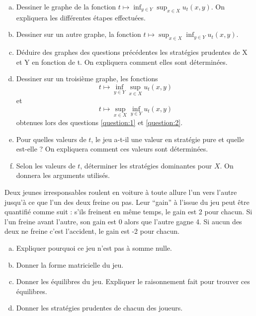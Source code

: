 \documentclass[french,11pt,leqno]{article}
\newcounter{exocount}
\newcounter{questcount}
\def\exo{\bigskip\noindent{\bf Exercice \theexocount {} -}
  \addtocounter{exocount}{1} \setcounter{questcount}{1}}
\begin{document}
\begin{enumerate}[a)]%
\item Dessiner le graphe de la fonction $t \mapsto \inf_{y \in Y} \sup_{x \in X} u_t(x,y)$. On expliquera les diff\'erentes \'etapes effectu\'ees. \label{question:1}
\item Dessiner sur un autre graphe, la fonction $t \mapsto \sup_{x \in X} \inf_{y \in Y} u_t(x,y)$. \label{question:2}
\item D\'eduire des graphes des questions pr\'ec\'edentes les strat\'egies prudentes de X et Y en fonction de t. 
     On expliquera comment elles sont d\'etermin\'ees.
\item Dessiner sur un troisi\`eme graphe, les fonctions \[t \mapsto \inf_{y \in Y} \sup_{x \in X} u_t(x,y)\] et \[t \mapsto \sup_{x \in X} \inf_{y \in Y} u_t(x,y)\]
 obtenues lors des questions \ref{question:1} et \ref{question:2}. 
\item Pour quelles valeurs de $t$, le jeu a-t-il une valeur en strat\'egie pure et quelle est-elle ? On expliquera comment ces valeurs sont d\'etermin\'ees.
\item Selon les valeurs de $t$, d\'eterminer les strat\'egies dominantes pour $X$. On donnera les arguments utilis\'es.


\end{enumerate}





\exo
Deux jeunes irresponsables roulent en voiture \`a toute allure l'un vers l'autre jusqu'\`a ce que l'un des deux freine ou pas. 
Leur ``gain'' \`a l'issue du jeu peut \^etre quantifi\'e comme suit : s'ils freinent en m\^eme
temps, le gain est 2 pour chacun. Si l'un freine avant l'autre, son gain est 0 alors que l'autre gagne 4. Si aucun
des deux ne freine c'est l'accident, le gain est -2 pour chacun.
\begin{enumerate}[a)]
  \item Expliquer pourquoi ce jeu n'est pas \`a somme nulle.
  \item Donner la forme matricielle du jeu.
  \item Donner les \'equilibres du jeu. Expliquer le raisonnement fait pour trouver ces \'equilibres.
  \item Donner les strat\'egies prudentes de chacun des joueurs.
\end{enumerate}
\end{document}
